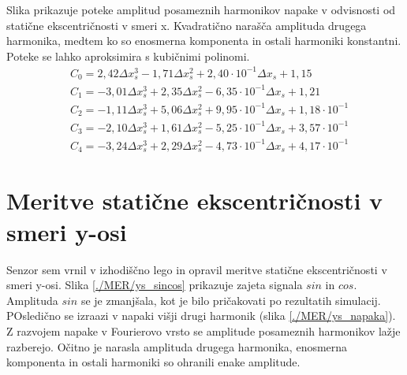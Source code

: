 Slika prikazuje poteke amplitud posameznih harmonikov napake v odvisnosti od statične ekscentričnosti v smeri x. Kvadratično narašča amplituda drugega harmonika, medtem ko so enosmerna komponenta in ostali harmoniki konstantni. Poteke se lahko aproksimira s kubičnimi polinomi.
\begin{eqnarray}
&C_0 =2,42\Delta x_s^{3}-1,71\Delta x_s^{2}+2,40\cdot 10^{-1}\Delta x_s+1,15 \\              
&C_1 =-3,01\Delta x_s^{3}+2,35\Delta x_s^{2}-6,35\cdot 10^{-1}\Delta x_s+1,21 \\             
&C_2 =-1,11\Delta x_s^{3}+5,06\Delta x_s^{2}+9,95\cdot 10^{-1}\Delta x_s+1,18\cdot 10^{-1} \\
&C_3 =-2,10\Delta x_s^{3}+1,61\Delta x_s^{2}-5,25\cdot 10^{-1}\Delta x_s+3,57\cdot 10^{-1} \\
&C_4 =-3,24\Delta x_s^{3}+2,29\Delta x_s^{2}-4,73\cdot 10^{-1}\Delta x_s+4,17\cdot 10^{-1}
\end{eqnarray}






\newpage
\section{Meritve statične ekscentričnosti v smeri y-osi}
Senzor sem vrnil v izhodiščno lego in opravil meritve statične ekscentričnosti v smeri y-osi. Slika \ref{./MER/ys_sincos} prikazuje zajeta signala $sin$ in $cos$. Amplituda $sin$ se je zmanjšala, kot je bilo pričakovati po rezultatih simulacij. POsledično se izraazi v napaki višji drugi harmonik (slika \ref{./MER/ys_napaka}). Z razvojem napake v Fourierovo vrsto se amplitude posameznih harmonikov lažje razberejo. Očitno je narasla amplituda drugega harmonika, enosmerna komponenta in ostali harmoniki so ohranili enake amplitude.
